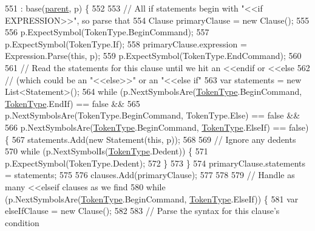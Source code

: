 \begin{DoxyCode}
551                                                              : base(\hyperlink{a00077_af313a82103fcc2ff5a177dbb06b92f7b}{parent}, p) \{
552 
553                 \textcolor{comment}{// All if statements begin with "<<if EXPRESSION>>", so parse that}
554                 Clause primaryClause = \textcolor{keyword}{new} Clause();
555 
556                 p.ExpectSymbol(TokenType.BeginCommand);
557                 p.ExpectSymbol(TokenType.If);
558                 primaryClause.expression = Expression.Parse(\textcolor{keyword}{this}, p);
559                 p.ExpectSymbol(TokenType.EndCommand);
560 
561                 \textcolor{comment}{// Read the statements for this clause until  we hit an <<endif or <<else}
562                 \textcolor{comment}{// (which could be an "<<else>>" or an "<<else if"}
563                 var statements = \textcolor{keyword}{new} List<Statement>();
564                 \textcolor{keywordflow}{while} (p.NextSymbolsAre(\hyperlink{a00040_a301aa7c866593a5b625a8fc158bbeace}{TokenType}.BeginCommand, 
      \hyperlink{a00040_a301aa7c866593a5b625a8fc158bbeace}{TokenType}.EndIf) == \textcolor{keyword}{false} &&
565                     p.NextSymbolsAre(TokenType.BeginCommand, TokenType.Else) == \textcolor{keyword}{false} &&
566                     p.NextSymbolsAre(\hyperlink{a00040_a301aa7c866593a5b625a8fc158bbeace}{TokenType}.BeginCommand, \hyperlink{a00040_a301aa7c866593a5b625a8fc158bbeace}{TokenType}.ElseIf) == \textcolor{keyword}{false}) 
      \{
567                     statements.Add(\textcolor{keyword}{new} Statement(\textcolor{keyword}{this}, p));
568 
569                     \textcolor{comment}{// Ignore any dedents}
570                     \textcolor{keywordflow}{while} (p.NextSymbolIs(\hyperlink{a00040_a301aa7c866593a5b625a8fc158bbeace}{TokenType}.Dedent)) \{
571                         p.ExpectSymbol(TokenType.Dedent);
572                     \}
573                 \}
574                 primaryClause.statements = statements;
575 
576                 clauses.Add(primaryClause);
577 
578 
579                 \textcolor{comment}{// Handle as many <<elseif clauses as we find}
580                 \textcolor{keywordflow}{while} (p.NextSymbolsAre(\hyperlink{a00040_a301aa7c866593a5b625a8fc158bbeace}{TokenType}.BeginCommand, 
      \hyperlink{a00040_a301aa7c866593a5b625a8fc158bbeace}{TokenType}.ElseIf)) \{
581                     var elseIfClause = \textcolor{keyword}{new} Clause();
582 
583                     \textcolor{comment}{// Parse the syntax for this clause's condition}

\end{DoxyCode}
